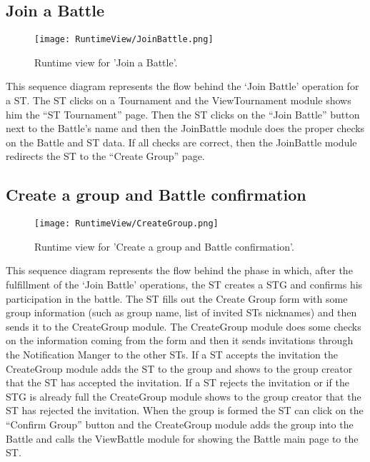 \subsection{Join a Battle}
\begin{figure}[H]
    \begin{center}
        \texttt{[image: RuntimeView/JoinBattle.png]}
        \caption{Runtime view for 'Join a Battle'.}
        \label{fig:runtime_joinbattle}%
    \end{center}
\end{figure}
This sequence diagram represents the flow behind the ‘Join Battle’ operation for a ST. The ST clicks on a Tournament and the ViewTournament module shows him the “ST Tournament” page. Then the ST clicks on the “Join Battle” button next to the Battle’s name and then the JoinBattle module does the proper checks on the Battle and ST data. If all checks are correct, then the JoinBattle module redirects the ST to the “Create Group” page.


\subsection{Create a group and Battle confirmation}
\begin{figure}[H]
    \begin{center}
        \texttt{[image: RuntimeView/CreateGroup.png]}
        \caption{Runtime view for 'Create a group and Battle confirmation'.}
        \label{fig:runtime_creategroup}%
    \end{center}
\end{figure}
This sequence diagram represents the flow behind the phase in which, after the fulfillment of the ‘Join Battle’ operations, the ST creates a STG and confirms his participation in the battle.
The ST fills out the Create Group form with some group information (such as group name, list of invited STs nicknames) and then sends it to the CreateGroup module.
The CreateGroup module does some checks on the information coming from the form and then it sends invitations through the Notification Manger to the other STs. If a ST accepts the invitation the CreateGroup module adds the ST to the group and shows to the group creator that the ST has accepted the invitation. If a ST rejects the invitation or if the STG is already full the CreateGroup module shows to the group creator that the ST has rejected the invitation. When the group is formed the ST can click on the “Confirm Group” button and the CreateGroup module adds the group into the Battle and calls the ViewBattle module for showing the Battle main page to the ST.


